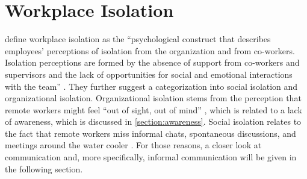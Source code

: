 \section{Workplace Isolation}
\citeauthor{marshall2007workplace} define workplace isolation as the \enquote{psychological construct that describes employees’ perceptions of isolation from the organization and from co-workers. Isolation perceptions are formed by the absence of support from co-workers and supervisors and the lack of opportunities for social and emotional interactions with the team} \autocite[p.~198]{marshall2007workplace}. They further suggest a categorization into social isolation and organizational isolation. Organizational isolation stems from the perception that remote workers might feel \enquote{out of sight, out of mind} \autocite{bailey1999advantages}, which is related to a lack of awareness, which is discussed in \autoref{section:awareness}. Social isolation relates to the fact that remote workers miss informal chats, spontaneous discussions, and meetings around the water cooler \autocite{cooper2002telecommuting}. For those reasons, a closer look at communication and, more specifically, informal communication will be given in the following section.

